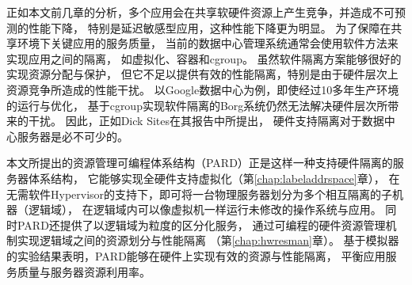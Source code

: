 %
%
正如本文前几章的分析，多个应用会在共享软硬件资源上产生竞争，并造成不可预测的性能下降，
特别是延迟敏感型应用，这种性能下降更为明显。
为了保障在共享环境下关键应用的服务质量，
当前的数据中心管理系统通常会使用软件方法来实现应用之间的隔离，
如虚拟化、容器和cgroup。
虽然软件隔离方案能够很好的实现资源分配与保护，
但它不足以提供有效的性能隔离，特别是由于硬件层次上资源竞争所造成的性能干扰。
以Google数据中心为例，即使经过10多年生产环境的运行与优化，
基于cgroup实现软件隔离的Borg系统仍然无法解决硬件层次所带来的干扰\cite{borg:2015}。
因此，正如Dick Sites在其报告\cite{Dick:2015}中所提出，
硬件支持隔离对于数据中心服务器是必不可少的。

本文所提出的资源管理可编程体系结构（PARD）正是这样一种支持硬件隔离的服务器体系结构，
它能够实现全硬件支持虚拟化（第\ref{chap:labeladdrspace}章），
在无需软件Hypervisor的支持下，即可将一台物理服务器划分为多个相互隔离的子机器（逻辑域），
在逻辑域内可以像虚拟机一样运行未修改的操作系统与应用。
同时PARD还提供了以逻辑域为粒度的区分化服务，
通过可编程的硬件资源管理机制实现逻辑域之间的资源划分与性能隔离
（第\ref{chap:hwresman}章）。
基于模拟器的实验结果表明，PARD能够在硬件上实现有效的资源与性能隔离，
平衡应用服务质量与服务器资源利用率。


